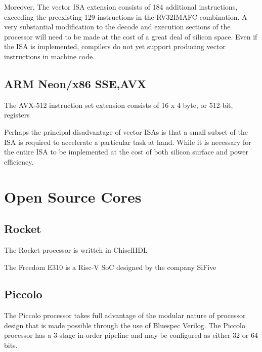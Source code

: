 \documentclass[a4paper,8pt]{report}
\begin{document}
Moreover, The vector ISA extension consists of 184
additional instructions, exceeding the preexisting 129 instructions in the
RV32IMAFC combination. A very substantial modification to the decode and
execution sections of the processor will need to be made at the cost of a great
deal of silicon space. Even if the ISA is implemented, compilers do not yet
support producing vector instructions in machine code.


\subsection{ARM Neon/x86 SSE,AVX}
The AVX-512 instruction set extension
consists of 16 x 4 byte, or 512-bit, registers

Perhaps the principal disadvantage of vector ISAs is that a small subset of the
ISA is required to accelerate a particular task at hand. While it is necessary
for the entire ISA to be implemented at the cost of both silicon surface and
power efficiency.






\section{Open Source Cores}

\subsection{Rocket}
The Rocket processor is writteh in ChiselHDL

The Freedom E310 is a Risc-V SoC designed by the company SiFive

\subsection{Piccolo}

The Piccolo processor takes full advantage of the modular nature of processor
design that is made possible through the use of Bluespec Verilog. 
The Piccolo processor has a 3-stage in-order pipeline and may be configured as
either 32 or 64 bits.

\end{document}
